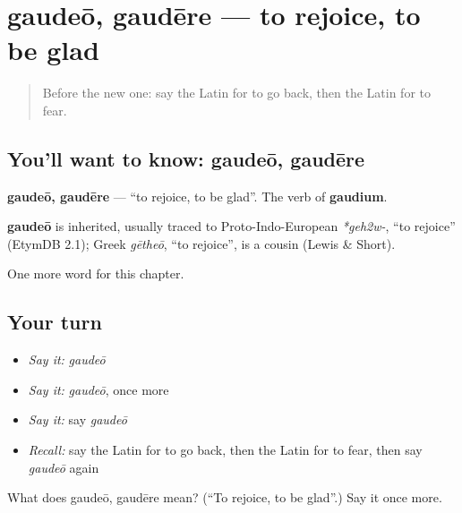 \section[gaudeō, gaudēre]{gaudeō, gaudēre — to rejoice, to be glad}

\label{lesson:LA-C78-gaudeo}



\begin{quote}
Before the new one: say the Latin for to go back, then the Latin for to fear.
\end{quote}

\subsection*{You'll want to know: gaudeō, gaudēre}
\textbf{gaudeō, gaudēre} — \textquotedblleft{}to rejoice, to be glad\textquotedblright{}. The verb of \textbf{gaudium}.

\begin{cousinweb}
\textbf{gaudeō} is inherited, usually traced to Proto-Indo-European \emph{*geh2w-}, \textquotedblleft{}to rejoice\textquotedblright{} (EtymDB 2.1); Greek \emph{gētheō}, \textquotedblleft{}to rejoice\textquotedblright{}, is a cousin (Lewis \& Short).
\end{cousinweb}

\begin{grammarlens}[title={What you've built}]
One more word for this chapter.
\end{grammarlens}

\subsection*{Your turn}
\begin{itemize}
\raggedright
  \item \emph{Say it:} \emph{gaudeō}
  \item \emph{Say it:} \emph{gaudeō}, once more
  \item \emph{Say it:} say \emph{gaudeō}
  \item \emph{Recall:} say the Latin for to go back, then the Latin for to fear, then say \emph{gaudeō} again
\end{itemize}

\begin{tcolorbox}[breakable,colback=teal!4,colframe=teal!35!black,title={Before you move on}]
What does gaudeō, gaudēre mean? (\textquotedblleft{}To rejoice, to be glad\textquotedblright{}.) Say it once more.
\end{tcolorbox}
